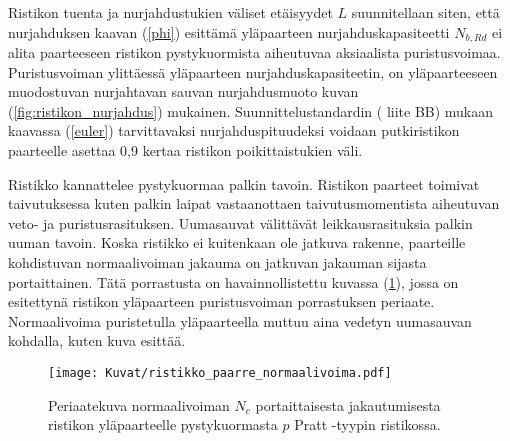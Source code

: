 \documentclass[12pt]{article}
\newenvironment{content}{\pagenumbering{arabic}}{}
\begin{document}
\begin{content}
Ristikon tuenta ja nurjahdustukien väliset etäisyydet $L$ suunnitellaan siten, että nurjahduksen kaavan (\ref{phi}) esittämä yläpaarteen nurjahduskapasiteetti $N_{b,Rd}$ ei alita paarteeseen ristikon pystykuormista aiheutuvaa aksiaalista puristusvoimaa. Puristusvoiman ylittäessä yläpaarteen nurjahduskapasiteetin, on yläpaarteeseen muodostuvan nurjahtavan sauvan nurjahdusmuoto kuvan (\ref{fig:ristikon_nurjahdus}) mukainen. Suunnittelustandardin (\citeauthor{en1993} liite BB) mukaan kaavassa (\ref{euler}) tarvittavaksi nurjahduspituudeksi voidaan putkiristikon paarteelle asettaa 0,9 kertaa ristikon poikittaistukien väli.

Ristikko kannattelee pystykuormaa palkin tavoin. Ristikon paarteet toimivat taivutuksessa kuten palkin laipat vastaanottaen taivutusmomentista aiheutuvan veto- ja puristusrasituksen. Uumasauvat välittävät leikkausrasituksia palkin uuman tavoin. Koska ristikko ei kuitenkaan ole jatkuva rakenne, paarteille kohdistuvan normaalivoiman jakauma on jatkuvan jakauman sijasta portaittainen. Tätä porrastusta on havainnollistettu kuvassa (\ref{fig:ristikon_yläpaarteen_puristus}), jossa on esitettynä ristikon yläpaarteen puristusvoiman porrastuksen periaate. Normaalivoima puristetulla yläpaarteella muttuu aina vedetyn uumasauvan kohdalla, kuten kuva esittää. 

\begin{figure}[htb]
\texttt{[image: Kuvat/ristikko\_paarre\_normaalivoima.pdf]}
\caption{Periaatekuva normaalivoiman $N_c$ portaittaisesta jakautumisesta ristikon yläpaarteelle pystykuormasta $p$ Pratt -tyypin ristikossa.}
\label{fig:ristikon_yläpaarteen_puristus}
\end{figure}







\end{content}
\end{document}

